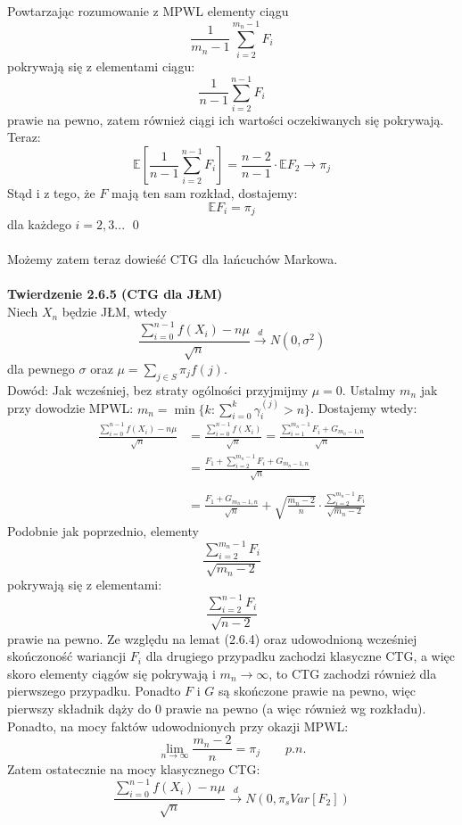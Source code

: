\documentclass[a4paper]{article}
\begin{document}
Powtarzając rozumowanie z MPWL elementy ciągu 
$$\frac{1}{m_n - 1} \sum\limits_{i = 2}^{m_n - 1} F_i$$
pokrywają się z elementami ciągu:
$$\frac{1}{n - 1} \sum\limits_{i = 2}^{n - 1} F_i$$
prawie na pewno, zatem również ciągi ich wartości oczekiwanych się pokrywają. Teraz:
$$\mathbb{E}\left[\frac{1}{n - 1} \sum\limits_{i = 2}^{n - 1} F_i\right] = \frac{n-2}{n - 1}\cdot \mathbb{E}F_2 \to \pi_j$$
Stąd i z tego, że $F$ mają ten sam rozkład, dostajemy:
$$\mathbb{E}F_i = \pi_j$$
dla każdego $i = 2,3...$ \qed
\\\\
Możemy zatem teraz dowieść CTG dla łańcuchów Markowa.\\
\\
\textbf{Twierdzenie 2.6.5 (CTG dla JŁM)}\\
Niech $X_n$ będzie JŁM, wtedy
$$ \frac{\sum\limits_{i=0}^{n-1} f(X_i) - n\mu}{\sqrt{n}} \overset{d}{\to} N(0, \sigma^2)$$
dla pewnego $\sigma$ oraz $\mu = \sum\limits_{j \in S} \pi_j f(j)$. \\
Dowód: Jak wcześniej, bez straty ogólności przyjmijmy $\mu = 0$. Ustalmy $m_n$ jak przy dowodzie MPWL:
$m_n = \min \{k: \sum\limits_{i=0}^k \gamma_i^{(j)} > n\}$. Dostajemy wtedy:
\begin{align*}
    \frac{\sum\limits_{i=0}^{n-1} f(X_i) - n\mu}{\sqrt{n}} &= \frac{\sum\limits_{i=0}^{n-1} f(X_i)}{\sqrt{n}} = \frac{\sum\limits_{i=1}^{m_n-1} F_i + G_{m_n-1, n}}{\sqrt{n}}\\
    &= \frac{F_1 + \sum\limits_{i=2}^{m_n-1} F_i + G_{m_n-1, n}}{\sqrt{n}}\\\\
    &= \frac{F_1 + G_{m_n-1, n}}{\sqrt{n}} + \sqrt{\frac{m_n -2}{n}} \cdot \frac{\sum\limits_{i=2}^{m_n-1} F_i }{\sqrt{m_n-2}}
\end{align*}
Podobnie jak poprzednio, elementy $$\frac{\sum\limits_{i=2}^{m_n-1} F_i }{\sqrt{m_n-2}}$$
pokrywają się z elementami: 
$$\frac{\sum\limits_{i=2}^{n-1} F_i }{\sqrt{n-2}}$$
prawie na pewno. Ze względu na lemat (2.6.4) oraz udowodnioną wcześniej skończoność wariancji $F_i$ dla drugiego przypadku zachodzi klasyczne CTG, a więc skoro elementy ciągów się pokrywają i $m_n \to \infty$, to CTG zachodzi również dla pierwszego przypadku. Ponadto $F$ i $G$ są skończone prawie na pewno, więc pierwszy składnik dąży do 0 prawie na pewno (a więc również wg rozkładu). Ponadto, na mocy faktów udowodnionych przy okazji MPWL: 
$$ \lim\limits_{n \to \infty} \frac{m_n -2}{n} = \pi_j \quad\quad p.n.$$
Zatem ostatecznie na mocy klasycznego CTG:
$$\frac{\sum\limits_{i=0}^{n-1} f(X_i) - n\mu}{\sqrt{n}} \overset{d}{\to} N(0, \pi_s Var[F_2])$$
\end{document}
